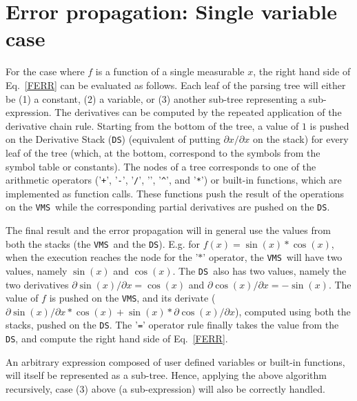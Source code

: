 \documentclass[12pt]{article}
\newcommand{\DS}{{\tt DS}}
\newcommand{\VMS}{{\tt VMS}}
\begin{document}
\section{Error propagation: Single variable case}
\label{SEC:SINGLE_VAR}

For the case where $f$ is a function of a single measurable $x$, the
right hand side of Eq.~\ref{FERR} can be evaluated as follows.  Each
leaf of the parsing tree will either be (1) a constant, (2) a
variable, or (3) another sub-tree representing a sub-expression.  The
derivatives can be computed by the repeated application of the
derivative chain rule.  Starting from the bottom of the tree, a value
of $1$ is pushed on the Derivative Stack (\DS) (equivalent of putting
$\partial x / \partial x$ on the stack) for every leaf of the tree
(which, at the bottom, correspond to the symbols from the symbol
table or constants).  The nodes of a tree corresponds to one of the
arithmetic operators ('{\tt +}', '{\tt -}', '{\tt /}', '{\tt *}',
'{\texttt {\^}}', and '{\tt **}') or built-in functions, which are
implemented as function calls.  These functions push the result of the
operations on the \VMS\ while the corresponding partial derivatives
are pushed on the \DS.

The final result and the error propagation will in general use the
values from both the stacks (the \VMS\ and the \DS).  E.g. for
$f(x)=\sin(x)*\cos(x)$, when the execution reaches the node for the
'$*$' operator, the \VMS\ will have two values, namely $\sin(x)$ and
$\cos(x)$.  The \DS\ also has two values, namely the two derivatives
$\partial \sin(x) / \partial x = \cos(x)$ and $\partial \cos(x) /
\partial x = -\sin(x)$.  The value of $f$ is pushed on the \VMS,
and its derivate ($\partial \sin(x) / \partial x * \cos(x) + \sin(x) *
\partial \cos(x) / \partial x$), computed using both the stacks, pushed
on the \DS.  The '{\tt =}' operator rule finally takes the value from
the \DS, and compute the right hand side of Eq.~\ref{FERR}.

An arbitrary expression composed of user defined variables or built-in
functions, will itself be represented as a sub-tree.  Hence, applying
the above algorithm recursively, case (3) above (a sub-expression)
will also be correctly handled.
\end{document}
